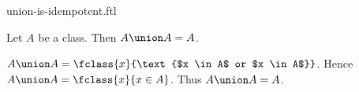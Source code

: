 \documentclass{article}
\begin{document}
\begin{smodule}[creators={Marcel Schütz}]{union-is-idempotent.ftl}

  \begin{fproposition*}[label=6505712620404736]
    Let $A$ be a class.
    Then $A \union A = A$.
  \end{fproposition*}
  \begin{fproof}
    $A \union A = \fclass{x}{\text{$x \in A$ or $x \in A$}}$.
    Hence $A \union A = \fclass{x}{x \in A}$.
    Thus $A \union A = A$.
  \end{fproof}
\end{smodule}
\end{document}
